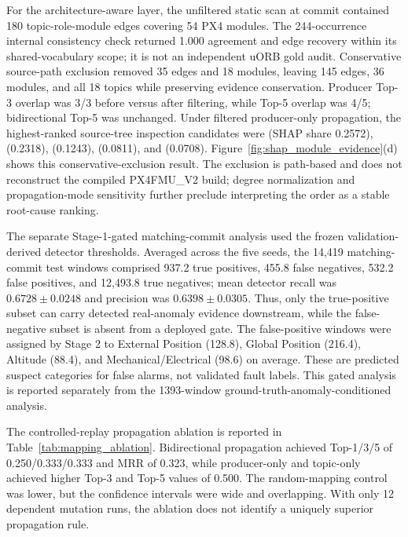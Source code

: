 For the architecture-aware layer, the unfiltered static scan at commit \texttt{} contained 180 topic-role-module edges covering 54 PX4 modules. The 244-occurrence internal consistency check returned 1.000 agreement and edge recovery within its shared-vocabulary scope; it is not an independent uORB gold audit. Conservative source-path exclusion removed 35 edges and 18 modules, leaving 145 edges, 36 modules, and all 18 topics while preserving evidence conservation. Producer Top-3 overlap was 3/3 before versus after filtering, while Top-5 overlap was 4/5; bidirectional Top-5 was unchanged. Under filtered producer-only propagation, the highest-ranked source-tree inspection candidates were  (SHAP share 0.2572),  (0.2318),  (0.1243),  (0.0811), and  (0.0708). Figure~\ref{fig:shap_module_evidence}(d) shows this conservative-exclusion result. The exclusion is path-based and does not reconstruct the compiled PX4FMU\_V2 build; degree normalization and propagation-mode sensitivity further preclude interpreting the order as a stable root-cause ranking.

The separate Stage-1-gated matching-commit analysis used the frozen validation-derived detector thresholds. Averaged across the five seeds, the 14,419 matching-commit test windows comprised 937.2 true positives, 455.8 false negatives, 532.2 false positives, and 12,493.8 true negatives; mean detector recall was $0.6728 \pm 0.0248$ and precision was $0.6398 \pm 0.0305$. Thus, only the true-positive subset can carry detected real-anomaly evidence downstream, while the false-negative subset is absent from a deployed gate. The false-positive windows were assigned by Stage 2 to External Position (128.8), Global Position (216.4), Altitude (88.4), and Mechanical/Electrical (98.6) on average. These are predicted suspect categories for false alarms, not validated fault labels. This gated analysis is reported separately from the 1393-window ground-truth-anomaly-conditioned analysis.

The controlled-replay propagation ablation is reported in Table~\ref{tab:mapping_ablation}. Bidirectional propagation achieved Top-1/3/5 of 0.250/0.333/0.333 and MRR of 0.323, while producer-only and topic-only achieved higher Top-3 and Top-5 values of 0.500. The random-mapping control was lower, but the confidence intervals were wide and overlapping. With only 12 dependent mutation runs, the ablation does not identify a uniquely superior propagation rule.

